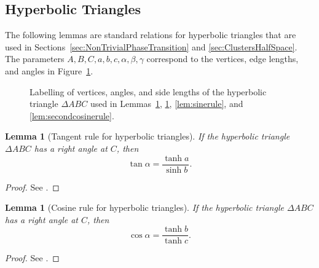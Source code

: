 \documentclass[10pt,a4paper,dvipsnames]{article}
\newtheorem{lemma}[theorem]{Lemma}
\theoremstyle{definition}
\theoremstyle{remark}
\numberwithin{equation}{section}
\begin{document}
\begin{appendix}
\section{Hyperbolic Triangles}
\label{app:hyperbolictriangles}
    The following lemmas are standard relations for hyperbolic triangles that are used in Sections~\ref{sec:NonTrivialPhaseTransition} and \ref{sec:ClustersHalfSpace}. The parameters $A,B,C,a,b,c,\alpha,\beta,\gamma$ correspond to the vertices, edge lengths, and angles in Figure~\ref{fig:labellingHyperbolicTriangle}.

\begin{figure}
    \centering
    \caption{Labelling of vertices, angles, and side lengths of the hyperbolic triangle $\Delta ABC$ used in Lemmas~\ref{lem:tangentformula}, \ref{lem:cosineformula}, \ref{lem:sinerule}, and \ref{lem:secondcosinerule}.}
    \label{fig:labellingHyperbolicTriangle}
\end{figure}

\begin{lemma}[Tangent rule for hyperbolic triangles]\label{lem:tangentformula}
    If the hyperbolic triangle $\Delta ABC$ has a right angle at $C$, then
    \begin{equation}
        \tan \alpha = \frac{\tanh a}{\sinh b}.
    \end{equation}
\end{lemma}
\begin{proof}
    See \cite[Corollary~32.13]{martin2012foundations}.
\end{proof}

\begin{lemma}[Cosine rule for hyperbolic triangles]\label{lem:cosineformula}
    If the hyperbolic triangle $\Delta ABC$ has a right angle at $C$, then
    \begin{equation}
        \cos \alpha = \frac{\tanh b}{\tanh c}.
    \end{equation}
\end{lemma}
\begin{proof}
    See \cite[Corollary~32.13]{martin2012foundations}.
\end{proof}


\end{appendix}
\end{document}
